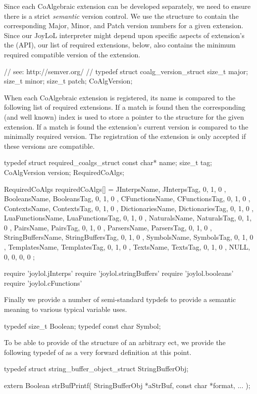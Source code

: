 Since each CoAlgebraic extension can be developed separately, we need to 
ensure there is a strict \emph{semantic} version control. We use the 
 structure to contain the corresponding Major, Minor, 
and Patch version numbers for a given extension. Since our JoyLoL 
interpreter might depend upon specific aspects of extension's the 
 (API), our list of required 
extensions, below, also contains the minimum required compatible version 
of the extension. 

\startCHeader
// see: http://semver.org/
//
typedef struct coalg_version_struct {
  size_t major;
  size_t minor;
  size_t patch;
} CoAlgVersion;
\stopCHeader

When each CoAlgebraic extension is registered, its name is compared to the 
following list of required extensions. If a match is found then the 
corresponding (and well known) index is used to store a pointer to the 
 structure for the given extension. If a match is found 
the extension's current version is compared to the minimally required 
version. The registration of the extension is only accepted if these 
versions are compatible. 

\startCCode
typedef struct required_coalgs_struct {
  const char*  name;
  size_t       tag;
  CoAlgVersion version;
} RequiredCoAlgs;

RequiredCoAlgs requiredCoAlgs[] = {
  { JInterpsName,      JInterpsTag,      {0, 1, 0 }},
  { BooleansName,      BooleansTag,      {0, 1, 0 }},
  { CFunctionsName,    CFunctionsTag,    {0, 1, 0 }},
  { ContextsName,      ContextsTag,      {0, 1, 0 }},
  { DictionariesName,  DictionariesTag,  {0, 1, 0 }},
  { LuaFunctionsName,  LuaFunctionsTag,  {0, 1, 0 }},
  { NaturalsName,      NaturalsTag,      {0, 1, 0 }},
  { PairsName,         PairsTag,         {0, 1, 0 }},
  { ParsersName,       ParsersTag,       {0, 1, 0 }},
  { StringBuffersName, StringBuffersTag, {0, 1, 0 }},
  { SymbolsName,       SymbolsTag,       {0, 1, 0 }},
  { TemplatesName,     TemplatesTag,     {0, 1, 0 }},
  { TextsName,         TextsTag,         {0, 1, 0 }},
  { NULL,              0,                {0, 0, 0 }}
};
\stopCCode

\startLuaCode
require 'joylol.jInterps'
require 'joylol.stringBuffers'
require 'joylol.booleans'
require 'joylol.cFunctions'
\stopLuaCode

Finally we provide a number of semi-standard typdefs to provide a semantic 
meaning to various typical variable uses. 

\startCHeader
typedef size_t     Boolean;
typedef const char Symbol;
\stopCHeader

To be able to provide  of the structure of an arbitrary 
ect, we provide the following typedef of 
 as a very forward definition at this point. 

\startCHeader
typedef struct string_buffer_object_struct StringBufferObj;

extern Boolean strBufPrintf(
  StringBufferObj   *aStrBuf,
  const char        *format, 
  ...
);
\stopCHeader